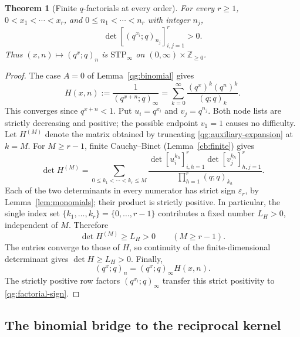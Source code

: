 \documentclass[11pt,a4paper]{article}
\newtheorem{theorem}{Theorem}[section]
\theoremstyle{definition}
\theoremstyle{remark}
\newcommand{\ep}{\varepsilon}
\newcommand{\STP}{\mathrm{STP}}
\begin{document}
\begin{theorem}[Finite \(q\)-factorials at every order]\label{qg:factorials}
For every \(r\ge1\), \(0<x_1<\cdots<x_r\), and
\(0\le n_1<\cdots<n_r\) with integer \(n_j\),
\begin{equation}\label{qg:factorial-sign}
 \det[(q^{x_i};q)_{n_j}]_{i,j=1}^r>0.
\end{equation}
Thus \((x,n)\mapsto(q^x;q)_n\) is \(\STP_\infty\) on
\((0,\infty)\times\mathbb Z_{\ge0}\).
\end{theorem}
\begin{proof}
The case \(A=0\) of Lemma~\ref{qg:binomial} gives
\begin{equation}\label{qg:auxiliary-expansion}
 H(x,n):=\frac{1}{(q^{x+n};q)_\infty}
 =\sum_{k=0}^{\infty}
   \frac{(q^x)^k(q^n)^k}{(q;q)_k}.
\end{equation}
This converges since \(q^{x+n}<1\). Put \(u_i=q^{x_i}\) and
\(v_j=q^{n_j}\). Both node lists are strictly decreasing and
positive; the possible endpoint \(v_1=1\) causes no difficulty.
Let \(H^{(M)}\) denote the matrix obtained by truncating
\eqref{qg:auxiliary-expansion} at \(k=M\).
For \(M\ge r-1\), finite Cauchy--Binet
(Lemma~\ref{cb:finite}) gives
\begin{equation}\label{qg:first-cb}
 \det H^{(M)}
 =\sum_{0\le k_1<\cdots<k_r\le M}
   \frac{
    \det[u_i^{k_h}]_{i,h=1}^r
    \det[v_j^{k_h}]_{h,j=1}^r}
   {\prod_{h=1}^r(q;q)_{k_h}}.
\end{equation}
Each of the two determinants in every numerator has strict sign
\(\ep_r\), by Lemma~\ref{lem:monomials}; their product is
strictly positive. In particular, the single index set
\(\{k_1,\ldots,k_r\}=\{0,\ldots,r-1\}\) contributes a fixed
number \(L_H>0\), independent of \(M\). Therefore
\[
 \det H^{(M)}\ge L_H>0\qquad(M\ge r-1).
\]
The entries converge to those of \(H\), so continuity of the
finite-dimensional determinant gives \(\det H\ge L_H>0\).
Finally,
\[
 (q^x;q)_n=(q^x;q)_\infty H(x,n).
\]
The strictly positive row factors \((q^{x_i};q)_\infty\)
transfer this strict positivity to \eqref{qg:factorial-sign}.
\end{proof}

\subsection{The binomial bridge to the reciprocal kernel}
\end{document}
